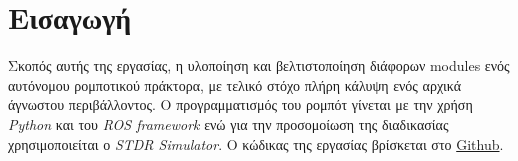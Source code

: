 \section*{Εισαγωγή}
Σκοπός αυτής της εργασίας, η υλοποίηση και βελτιστοποίηση διάφορων modules ενός αυτόνομου ρομποτικού πράκτορα, με τελικό στόχο πλήρη κάλυψη ενός αρχικά άγνωστου περιβάλλοντος. Ο προγραμματισμός του ρομπότ γίνεται με την χρήση \emph{Python} και του \emph{ROS framework} ενώ για την προσομοίωση της διαδικασίας χρησιμοποιείται ο \emph{STDR Simulator}. Ο κώδικας της εργασίας βρίσκεται στο \href{https://github.com/iodim/intelligent_robot_systems_2016}{Github}.
